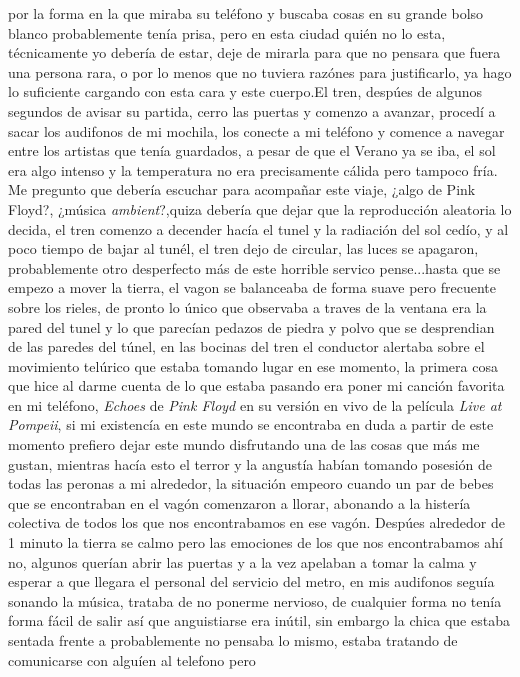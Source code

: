 \documentclass[letterpaper]{article}
\begin{document}
por la forma en la que miraba su teléfono y buscaba cosas en su grande bolso blanco probablemente tenía prisa,
pero en esta ciudad quién no lo esta, técnicamente yo debería de estar, deje de mirarla para que no
pensara que fuera una persona rara, o por lo menos que no tuviera razónes para justificarlo, ya hago
lo suficiente cargando con esta cara y este cuerpo.El tren, despúes de algunos segundos de avisar su partida,
cerro las puertas y comenzo a avanzar, procedí a sacar los audifonos de mi mochila, los conecte a mi
teléfono y comence a navegar entre los artistas que tenía guardados, a pesar de que el Verano ya se
iba, el sol era algo intenso y la temperatura no era precisamente cálida pero tampoco fría. Me
pregunto que debería escuchar para acompañar este viaje, ¿algo de Pink Floyd?, ¿música
\textit{ambient}?,quiza debería que dejar que la reproducción aleatoria lo decida, el tren comenzo a
decender hacía el tunel y la radiación del sol cedío, y al poco tiempo de bajar al tunél, el tren
dejo de circular, las luces se apagaron, probablemente otro desperfecto más de este horrible
servico pense...hasta que se empezo a mover la tierra, el vagon se balanceaba de forma suave pero
frecuente sobre los rieles, de pronto lo único que observaba a traves de la ventana era la pared del
tunel y lo que parecían pedazos de piedra y polvo que se desprendian de las paredes del túnel, en
las bocinas del tren el conductor alertaba sobre el movimiento telúrico que estaba tomando lugar en
ese momento, la
primera cosa que hice al darme cuenta de lo que estaba pasando era poner mi canción favorita en mi
teléfono, \textit{Echoes} de \textit{Pink Floyd} en su versión en vivo de la película \textit{Live
at Pompeii}, si mi existencía en este mundo se encontraba en duda a partir de este momento prefiero
dejar este mundo disfrutando una de las cosas que más me gustan, mientras hacía esto el terror y la
angustía habían tomando posesión de todas las peronas a mi alrededor, la situación empeoro
cuando un par de bebes que se encontraban en el vagón comenzaron a llorar, abonando a la histería
colectiva de todos los que nos encontrabamos en ese vagón. Despúes alrededor de 1 minuto la tierra
se calmo pero las emociones de los que nos encontrabamos ahí no, algunos querían abrir las puertas y
a la vez apelaban a tomar la calma y esperar a que llegara el personal del servicio del metro, en
mis audifonos seguía sonando la música, trataba de no ponerme nervioso, de cualquier forma no tenía
forma fácil de salir así que anguistiarse era inútil, sin embargo la chica que estaba sentada frente
a probablemente no pensaba lo mismo, estaba tratando de comunicarse con alguíen al telefono pero
\end{document}
